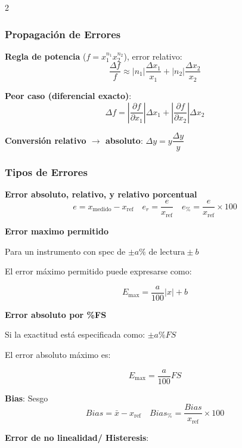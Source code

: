 \documentclass{article}
\begin{document}
\begin{multicols}{2}

\subsubsection*{Propagación de Errores}
\begin{itemform}
\item \textbf{Regla de potencia} ($f=x_1^{n_1}x_2^{n_2}$), error relativo:
$$\frac{\Delta f}{f} \approx |n_1|\frac{\Delta x_1}{x_1} + |n_2|\frac{\Delta x_2}{x_2}$$
\item \textbf{Peor caso (diferencial exacto)}:
$$\Delta f = \left|\frac{\partial f}{\partial x_1}\right|\Delta x_1 + \left|\frac{\partial f}{\partial x_2}\right|\Delta x_2$$
\item \textbf{Conversión relativo $\to$ absoluto}: $\Delta y = y\dfrac{\Delta y}{y}$
\end{itemform}

\subsubsection*{Tipos de Errores}

\begin{itemform}
    
\item \textbf{Error absoluto, relativo, y relativo porcentual}
\[
e=x_{\mathrm{medido}}-x_{\mathrm{ref}}
\quad e_r=
\frac{e}
{x_{\mathrm{ref}}}
\quad e_{\%}=\frac{e}{x_{\mathrm{ref}}}\times100
\]


\item \textbf{Error maximo permitido}

Para un instrumento con spec de $\pm a\%\text{ de lectura}\pm b$


El error máximo permitido puede expresarse como:

\[
E_{\max}
=
\frac{a}{100}|x|+b
\]

\item  \textbf{Error absoluto por \%FS}


Si la exactitud está especificada como: \(
\pm a\%FS
\)

El error absoluto máximo es:

\[
E_{\max}
=
\frac{a}{100}FS
\]

\item \textbf{Bias}:
Sesgo $$
Bias= \bar{x}-x_{\text{ref}} \quad Bias_{\%}=\frac{Bias}{x_{\text{ref}}}\times100
$$
\item \textbf{Error de no linealidad/ Histeresis}:


\end{itemform}
\end{multicols}
\end{document}
